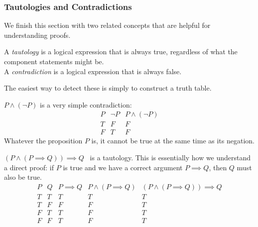 \subsubsection*{Tautologies and Contradictions}

We finish this section with two related concepts that are helpful for understanding proofs.

\begin{defn}
A \emph{tautology} is a logical expression that is always true, regardless of what the component statements might be.\\
A \emph{contradiction} is a logical expression that is always false.
\end{defn}

\noindent The easiest way to detect these is simply to construct a truth table.

\begin{examples}
	\item $P\wedge(\neg P)$ is a very simple contradiction:
	\[\begin{array}{cc|c}
	P & \neg P & P\wedge(\neg P)\\\hline
	T & F & F\\
	F & T & F
	\end{array}\]
	Whatever the proposition $P$ is, it cannot be true at the same time as its negation.
	\item $(P\wedge(P\implies Q))\implies Q$ \ is a tautology. This is essentially how we understand a direct proof: if $P$ is true and we have a correct argument $P\implies Q$, then $Q$ must also be true.
	\[\begin{array}{cc|cc|c}
	P & Q & P\implies Q & P\wedge(P\implies Q) & (P\wedge(P\implies Q))\implies Q\\\hline
	T & T & T & T& T\\
	T & F & F & F& T\\
	F & T & T & F& T\\
	F & F & T & F& T
	\end{array}\]
\end{examples}\goodbreak

